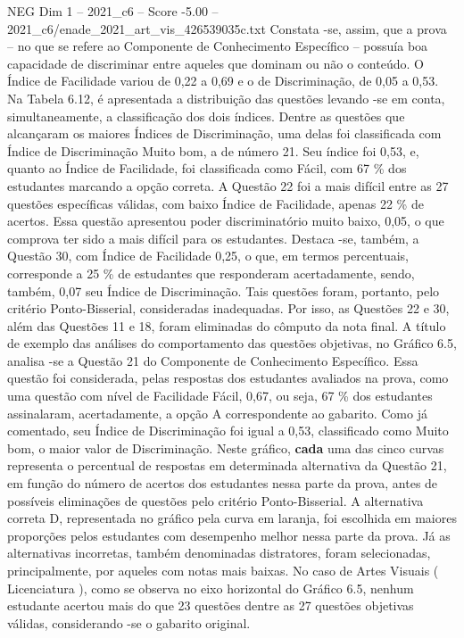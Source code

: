 \begin{textsample}{NEG Dim 1 – 2021\_c6 – Score -5.00 – 2021\_c6/enade\_2021\_art\_vis\_426539035c.txt}
Constata -se, assim, que a prova – no que se refere ao Componente de Conhecimento Específico – possuía boa capacidade de discriminar entre aqueles que dominam ou não o conteúdo.
O Índice de Facilidade variou de 0,22 a 0,69 e o de Discriminação, de 0,05 a 0,53.
Na Tabela 6.12, é apresentada a distribuição das questões levando -se em conta, simultaneamente, a classificação dos dois índices.
Dentre as questões que alcançaram os maiores Índices de Discriminação, uma delas foi classificada com Índice de Discriminação Muito bom, a de número 21.
Seu índice foi 0,53, e, quanto ao Índice de Facilidade, foi classificada como Fácil, com 67 \% dos estudantes marcando a opção correta.
A Questão 22 foi a mais difícil entre as 27 questões específicas válidas, com baixo Índice de Facilidade, apenas 22 \% de acertos.
Essa questão apresentou poder discriminatório muito baixo, 0,05, o que comprova ter sido a mais difícil para os estudantes.
Destaca -se, também, a Questão 30, com Índice de Facilidade 0,25, o que, em termos percentuais, corresponde a 25 \% de estudantes que responderam acertadamente, sendo, também, 0,07 seu Índice de Discriminação.
Tais questões foram, portanto, pelo critério Ponto-Bisserial, consideradas inadequadas.
Por isso, as Questões 22 e 30, além das Questões 11 e 18, foram eliminadas do cômputo da nota final.
A título de exemplo das análises do comportamento das questões objetivas, no Gráfico 6.5, analisa -se a Questão 21 do Componente de Conhecimento Específico.
Essa questão foi considerada, pelas respostas dos estudantes avaliados na prova, como uma questão com nível de Facilidade Fácil, 0,67, ou seja, 67 \% dos estudantes assinalaram, acertadamente, a opção A correspondente ao gabarito.
Como já comentado, seu Índice de Discriminação foi igual a 0,53, classificado como Muito bom, o maior valor de Discriminação.
Neste gráfico, \textbf{cada} uma das cinco curvas representa o percentual de respostas em determinada alternativa da Questão 21, em função do número de acertos dos estudantes nessa parte da prova, antes de possíveis eliminações de questões pelo critério Ponto-Bisserial.
A alternativa correta D, representada no gráfico pela curva em laranja, foi escolhida em maiores proporções pelos estudantes com desempenho melhor nessa parte da prova.
Já as alternativas incorretas, também denominadas distratores, foram selecionadas, principalmente, por aqueles com notas mais baixas.
No caso de Artes Visuais ( Licenciatura ), como se observa no eixo horizontal do Gráfico 6.5, nenhum estudante acertou mais do que 23 questões dentre as 27 questões objetivas válidas, considerando -se o gabarito original.

\end{textsample}
